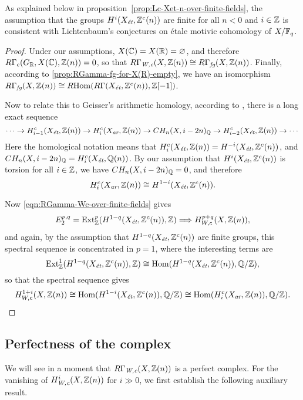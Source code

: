 \documentclass{article}
\numberwithin{equation}{section}
\begin{document}
As explained below in proposition~\ref{prop:Lc-Xet-n-over-finite-fields}, the
assumption that the groups $H^i (X_\et, \ZZ^c(n))$ are finite for all $n < 0$
and $i \in \ZZ$ is consistent with Lichtenbaum's conjectures on étale motivic
cohomology of $X/\FF_q$.

\begin{proof}
  Under our assumptions, $X (\CC) = X (\RR) = \emptyset$, and therefore
  $R\Gamma_c (G_\RR, X (\CC), \ZZ (n)) = 0$, so that
  $R\Gamma_\Wc (X,\ZZ(n)) \cong R\Gamma_\fg (X, \ZZ (n))$.
  Finally, according to \ref{prop:RGamma-fg-for-X(R)-empty}, we have
  an isomorphism
  $R\Gamma_\fg (X, \ZZ (n)) \cong \RHom (R\Gamma (X_\et, \ZZ^c (n)), \ZZ [-1])$.

  Now to relate this to Geisser's arithmetic homology, according to
  \cite[Theorem~3.1]{Geisser-2010-arithmetic-homology}, there is a long exact
  sequence
  \[ \cdots \to H_{i-1}^c (X_\et, \ZZ (n)) \to
    H_i^c (X_\ar, \ZZ (n)) \to CH_n (X, i-2n)_\QQ \to
    H_{i-2}^c (X_\et, \ZZ (n)) \to \cdots \]
  Here the homological notation means that
  $H_i^c (X_\et, \ZZ (n)) = H^{-i} (X_\et, \ZZ^c (n))$,
  and $CH_n (X, i-2n)_\QQ = H_i^c (X_\et, \QQ (n))$. By our assumption that
  $H^i (X_\et, \ZZ^c (n))$ is torsion for all $i \in \ZZ$, we have
  $CH_n (X, i-2n)_\QQ = 0$, and therefore
  $$H_i^c (X_\ar, \ZZ (n)) \cong H^{1-i} (X_\et, \ZZ^c (n)).$$

  Now \eqref{eqn:RGamma-Wc-over-finite-fields} gives
  \begin{equation}
    \label{eqn:RGamma-Wc-over-finite-fields-ss}
    E_2^{p,q} = \Ext_\ZZ^p (H^{1-q} (X_\et, \ZZ^c (n)), \ZZ) \Longrightarrow
    H^{p+q}_{W,c} (X, \ZZ (n)),
  \end{equation}
  and again, by the assumption that $H^{1-q} (X_\et, \ZZ^c (n))$ are finite
  groups, this spectral sequence is concentrated in $p = 1$, where the
  interesting terms are
  \[ \Ext_\ZZ^1 (H^{1-q} (X_\et, \ZZ^c (n)), \ZZ) \cong
    \Hom (H^{1-q} (X_\et, \ZZ^c (n)), \QQ/\ZZ), \]
  so that the spectral sequence gives
  \[ H^{1+i}_{W,c} (X, \ZZ (n)) \cong
    \Hom (H^{1-i} (X_\et, \ZZ^c (n)), \QQ/\ZZ) \cong
    \Hom (H_i^c (X_\ar, \ZZ (n)), \QQ/\ZZ). \qedhere \]
\end{proof}

\subsection*{Perfectness of the complex}

We will see in a moment that $R\Gamma_\Wc (X, \ZZ(n))$ is a perfect complex.
For the vanishing of $H^i_\Wc (X, \ZZ(n))$ for $i \gg 0$, we first establish the
following auxiliary result.
\end{document}
